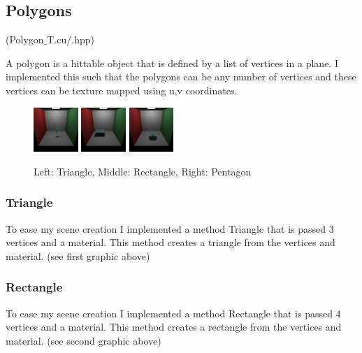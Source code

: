 \documentclass{article}
\begin{document}
    \subsection{Polygons}
    (Polygon$\_$T.cu/.hpp)\par
    A polygon is a hittable object that is defined by a list of vertices in a plane. I implemented this such that the polygons can be any number of vertices and these vertices can be texture mapped using u,v coordinates. \par

        \begin{figure}[H]
            \centering
            \includegraphics[width=0.15\textwidth]{samples/Triangle.png}
            \includegraphics[width=0.15\textwidth]{samples/Quad.png}
            \includegraphics[width=0.15\textwidth]{samples/Pentagon.png}
            \caption{Left: Triangle, Middle: Rectangle, Right: Pentagon}
        \end{figure}


        \subsubsection{Triangle}
        To ease my scene creation I implemented a method Triangle that is passed 3 vertices and a material. This method creates a triangle from the vertices and material. (see first graphic above) \par


        \subsubsection{Rectangle}
        To ease my scene creation I implemented a method Rectangle that is passed 4 vertices and a material. This method creates a rectangle from the vertices and material. (see second graphic above) \par
        
\end{document}
